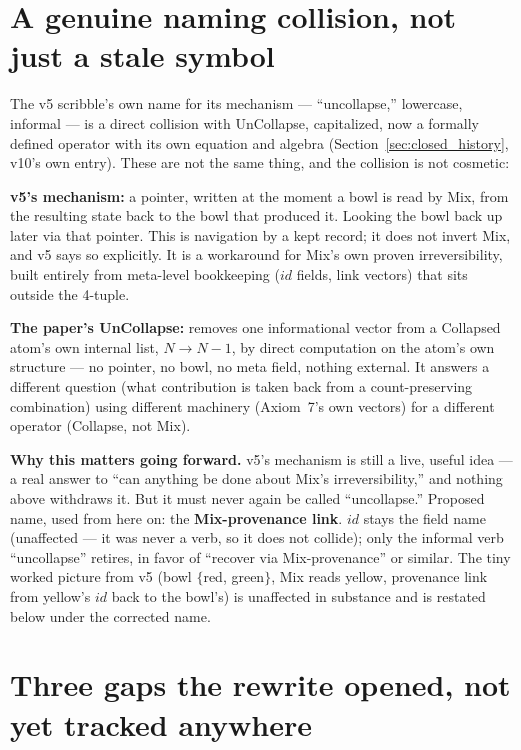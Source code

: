 \documentclass[11pt]{article}
\begin{document}
\section{A genuine naming collision, not just a stale symbol}
\label{sec:uncollapse_collision}

The v5 scribble's own name for its mechanism --- ``uncollapse,''
lowercase, informal --- is a direct collision with UnCollapse,
capitalized, now a formally defined operator with its own equation and
algebra (Section~\ref{sec:closed_history}, v10's own entry). These are
not the same thing, and the collision is not cosmetic:

\textbf{v5's mechanism:} a pointer, written at the moment a bowl is
read by Mix, from the resulting state back to the bowl that produced
it. Looking the bowl back up later via that pointer. This is
navigation by a kept record; it does not invert Mix, and v5 says so
explicitly. It is a workaround for Mix's own proven irreversibility,
built entirely from meta-level bookkeeping ($id$ fields, link
vectors) that sits outside the 4-tuple.

\textbf{The paper's UnCollapse:} removes one informational vector from
a Collapsed atom's own internal list, $N\to N-1$, by direct
computation on the atom's own structure --- no pointer, no bowl, no
meta field, nothing external. It answers a different question (what
contribution is taken back from a count-preserving combination) using
different machinery (Axiom~7's own vectors) for a different operator
(Collapse, not Mix).

\textbf{Why this matters going forward.} v5's mechanism is still a
live, useful idea --- a real answer to ``can anything be done about
Mix's irreversibility,'' and nothing above withdraws it. But it must
never again be called ``uncollapse.'' Proposed name, used from here on:
the \textbf{Mix-provenance link}. $id$ stays the field name (unaffected
--- it was never a verb, so it does not collide); only the informal
verb ``uncollapse'' retires, in favor of ``recover via Mix-provenance''
or similar. The tiny worked picture from v5 (bowl $\{$red,
green$\}$, Mix reads yellow, provenance link from yellow's $id$ back to
the bowl's) is unaffected in substance and is restated below under the
corrected name.

\section{Three gaps the rewrite opened, not yet tracked anywhere}
\end{document}
